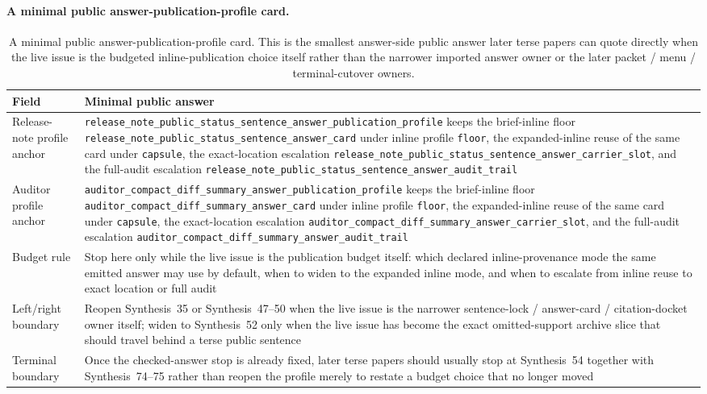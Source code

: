 \documentclass[11pt]{article}
\begin{document}
\paragraph{A minimal public answer-publication-profile card.}
\begin{table}[t]
\centering
\small
\begin{tabularx}{\linewidth}{@{}lX@{}}
\toprule
Field & Minimal public answer \\
\midrule
Release-note profile anchor & \nolinkurl{release_note_public_status_sentence_answer_publication_profile} keeps the brief-inline floor \nolinkurl{release_note_public_status_sentence_answer_card} under inline profile \nolinkurl{floor}, the expanded-inline reuse of the same card under \nolinkurl{capsule}, the exact-location escalation \nolinkurl{release_note_public_status_sentence_answer_carrier_slot}, and the full-audit escalation \nolinkurl{release_note_public_status_sentence_answer_audit_trail} \\
Auditor profile anchor & \nolinkurl{auditor_compact_diff_summary_answer_publication_profile} keeps the brief-inline floor \nolinkurl{auditor_compact_diff_summary_answer_card} under inline profile \nolinkurl{floor}, the expanded-inline reuse of the same card under \nolinkurl{capsule}, the exact-location escalation \nolinkurl{auditor_compact_diff_summary_answer_carrier_slot}, and the full-audit escalation \nolinkurl{auditor_compact_diff_summary_answer_audit_trail} \\
Budget rule & Stop here only while the live issue is the publication budget itself: which declared inline-provenance mode the same emitted answer may use by default, when to widen to the expanded inline mode, and when to escalate from inline reuse to exact location or full audit \\
Left/right boundary & Reopen Synthesis~35 or Synthesis~47--50 when the live issue is the narrower sentence-lock / answer-card / citation-docket owner itself; widen to Synthesis~52 only when the live issue has become the exact omitted-support archive slice that should travel behind a terse public sentence \\
Terminal boundary & Once the checked-answer stop is already fixed, later terse papers should usually stop at Synthesis~54 together with Synthesis~74--75 rather than reopen the profile merely to restate a budget choice that no longer moved \\
\bottomrule
\end{tabularx}
\caption{A minimal public answer-publication-profile card. This is the smallest answer-side public answer later terse papers can quote directly when the live issue is the budgeted inline-publication choice itself rather than the narrower imported answer owner or the later packet / menu / terminal-cutover owners.}
\label{tab:minimal-public-answer-publication-profile-card}
\end{table}
\end{document}

